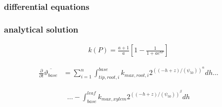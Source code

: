 \documentclass[twoside,10pt]{report}
\begin{document}
\subsubsection{differential equations}

\subsubsection{analytical solution}


\newpage

\begin{equation*}
    \begin{aligned}
    k(P) = \frac{a+1}{a} [1- \frac{1}{1+a e^{bP}}]
    \end{aligned}
\end{equation*} 

\begin{equation*}
    \begin{aligned}
    \frac{\partial}{\partial t}\overline{\vartheta_{base}} &= \sum_{i=1}^{n}
    \int_{tip,root,i}^{base} k_{max,root,i}2^{((-h+z) /(\psi_{50}))^\alpha}dh ...
    \end{aligned}
\end{equation*}
    
\begin{equation*}
    \begin{aligned} 
   ... - \int_{base}^{leaf} k_{max,xylem}2^{((-h+z)/(\psi_{50}))^\beta}dh 
    \end{aligned}
\end{equation*}
    
\end{document}
